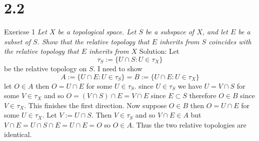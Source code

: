 \documentclass[11pt]{article}
\newcommand{\solution}[1]{{{\textcolor{header}{Solution:} \textcolor{solution}{#1}}}}
\begin{document}
\section{2.2}
Exericse 1
\emph{
    Let $X$ be a topological space. Let $S$ be a subspace of  $X$, and let  $E$ be a
    subset of  $S$. Show that the relative topology that  $E$ inherits from $S$ coincides with the relative topology that $E$ inherits from $X$
}
\solution{
    Let
    \[
        \tau_S := \{U \cap S: U \in \tau_X\}
    \] 
    be the relative topology on $S$.
    I need to show
    \[
        A := \{U \cap E: U \in \tau_S\} = B := \{U \cap E: U \in \tau_X\}
    \] 
    let $O \in A$ then $O = U \cap E$ for some $U \in \tau_S$. since  $U \in \tau_S$ we have
     $U = V \cap S$ for some  $V \in \tau_X$ and so  $O = (V \cap S) \cap E = V \cap E$ since  $E \subset S$ therefore $O \in B$ since $V \in \tau_X$.
     This finishes the first direction. Now suppose   $O \in B$ then  $O = U \cap E$ for some  $U \in \tau_X$. Let  $V := U \cap S$.
     Then $V \in \tau_S$ and so  $V \cap E \in A$ but  $V \cap E = U \cap S \cap E = U \cap E = O$ so  $O \in A$.
     Thus the two relative topologies are identical.
}
\end{document}
